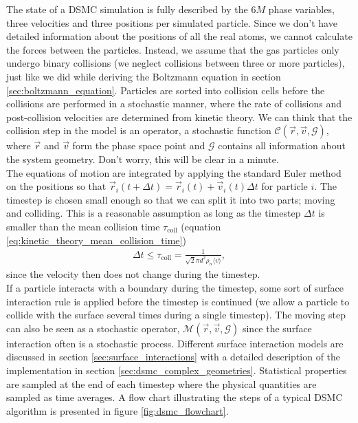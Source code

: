 The state of a DSMC simulation is fully described by the $6M$ phase variables, three velocities and three positions per simulated particle. Since we don't have detailed information about the positions of all the real atoms, we cannot calculate the forces between the particles. Instead, we assume that the gas particles only undergo binary collisions (we neglect collisions between three or more particles), just like we did while deriving the Boltzmann equation in section \ref{sec:boltzmann_equation}. Particles are sorted into collision cells before the collisions are performed in a stochastic manner, where the rate of collisions and post-collision velocities are determined from kinetic theory. We can think that the collision step in the model is an operator, a stochastic function $\mathcal{C}(\vec r, \vec v, \mathcal{G})$, where $\vec r$ and $\vec v$ form the phase space point and $\mathcal G$ contains all information about the system geometry. Don't worry, this will be clear in a minute.\\
The equations of motion are integrated by applying the standard Euler method on the positions so that $\vec r_i(t+\Delta t) = \vec r_i(t) + \vec v_i(t)\Delta t$ for particle $i$. The timestep is chosen small enough so that we can split it into two parts; moving and colliding. This is a reasonable assumption as long as the timestep $\Delta t$ is smaller than the mean collision time $\tau_\text{coll}$ (equation \eqref{eq:kinetic_theory_mean_collision_time})
\begin{align}
	\Delta t \leq \tau_\text{coll} = \frac{1}{\sqrt 2 \pi d^2 \rho_n \langle v \rangle},
\end{align}
since the velocity then does not change during the timestep.\\
If a particle interacts with a boundary during the timestep, some sort of surface interaction rule is applied before the timestep is continued (we allow a particle to collide with the surface several times during a single timestep). The moving step can also be seen as a stochastic operator, $\mathcal{M}(\vec r, \vec v, \mathcal{G})$ since the surface interaction often is a stochastic process. Different surface interaction models are discussed in section \ref{sec:surface_interactions} with a detailed description of the implementation in section \ref{sec:dsmc_complex_geometries}. Statistical properties are sampled at the end of each timestep where the physical quantities are sampled as time averages. A flow chart illustrating the steps of a typical DSMC algorithm is presented in figure \ref{fig:dsmc_flowchart}.
